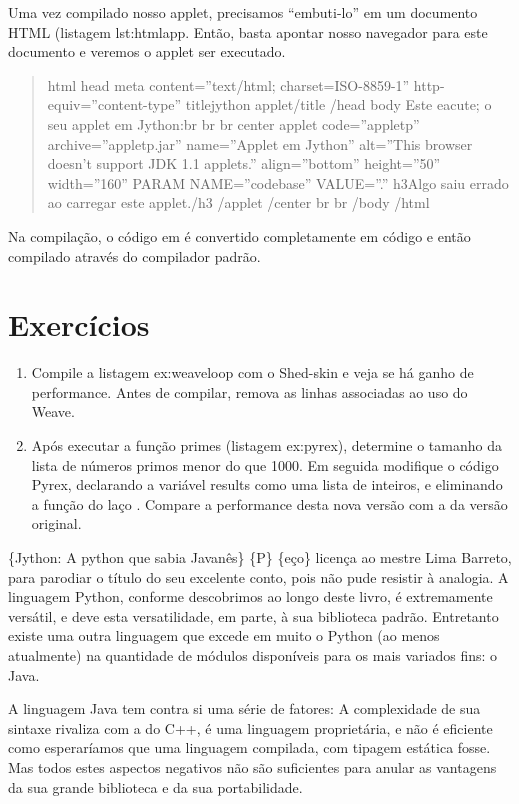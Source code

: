 \documentclass[a4paper,10pt,portuguese]{sphinxmanual}
\begin{document}
Uma vez compilado nosso applet, precisamos ``embuti-lo'' em um
documento HTML (listagem lst:htmlapp. Então, basta apontar nosso
navegador para este documento e veremos o applet ser executado.
\begin{quote}

html head meta content=''text/html; charset=ISO-8859-1''
http-equiv=''content-type'' titlejython applet/title /head body Este
eacute; o seu applet em Jython:br br br center applet
code=''appletp'' archive=''appletp.jar'' name=''Applet em Jython''
alt=''This browser doesn't support JDK 1.1 applets.'' align=''bottom''
height=''50'' width=''160'' PARAM NAME=''codebase'' VALUE=''.'' h3Algo saiu
errado ao carregar este applet./h3 /applet /center br br /body
/html
\end{quote}

Na compilação, o código em  é convertido completamente em
código  e então compilado através do compilador 
padrão.


\chapter{Exercícios}
\label{capext:exercicios}\begin{enumerate}
\item {} 
Compile a listagem ex:weaveloop com o Shed-skin e veja se há ganho
de performance. Antes de compilar, remova as linhas associadas ao
uso do Weave.

\item {} 
Após executar a função primes (listagem ex:pyrex), determine o
tamanho da lista de números primos menor do que 1000. Em seguida
modifique o código Pyrex, declarando a variável results como uma
lista de inteiros, e eliminando a função  do laço
. Compare a performance desta nova versão com a da versão
original.

\end{enumerate}

\{Jython: A python que sabia Javanês\} \{P\} \{eço\} licença ao mestre
Lima Barreto, para parodiar o título do seu excelente conto, pois
não pude resistir à analogia. A linguagem Python, conforme
descobrimos ao longo deste livro, é extremamente versátil, e deve
esta versatilidade, em parte, à sua biblioteca padrão. Entretanto
existe uma outra linguagem que excede em muito o Python (ao menos
atualmente) na quantidade de módulos disponíveis para os mais
variados fins: o Java.

A linguagem Java tem contra si uma série de fatores: A complexidade
de sua sintaxe rivaliza com a do C++, é uma linguagem proprietária,
e não é eficiente como esperaríamos que uma linguagem compilada,
com tipagem estática fosse. Mas todos estes aspectos negativos não
são suficientes para anular as vantagens da sua grande biblioteca e
da sua portabilidade.
\end{document}

